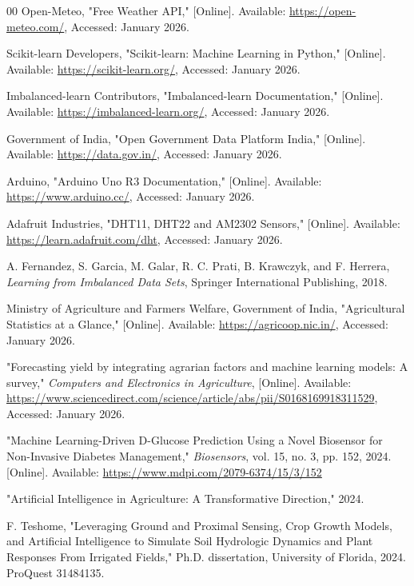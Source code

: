 \documentclass[10pt,twocolumn]{article}
\begin{document}
\begin{thebibliography}{00}
 Open-Meteo, "Free Weather API," [Online]. Available: \url{https://open-meteo.com/}, Accessed: January 2026.

 Scikit-learn Developers, "Scikit-learn: Machine Learning in Python," [Online]. Available: \url{https://scikit-learn.org/}, Accessed: January 2026.

 Imbalanced-learn Contributors, "Imbalanced-learn Documentation," [Online]. Available: \url{https://imbalanced-learn.org/}, Accessed: January 2026.

 Government of India, "Open Government Data Platform India," [Online]. Available: \url{https://data.gov.in/}, Accessed: January 2026.

 Arduino, "Arduino Uno R3 Documentation," [Online]. Available: \url{https://www.arduino.cc/}, Accessed: January 2026.

 Adafruit Industries, "DHT11, DHT22 and AM2302 Sensors," [Online]. Available: \url{https://learn.adafruit.com/dht}, Accessed: January 2026.

 A. Fernandez, S. Garcia, M. Galar, R. C. Prati, B. Krawczyk, and F. Herrera, \textit{Learning from Imbalanced Data Sets}, Springer International Publishing, 2018.

 Ministry of Agriculture and Farmers Welfare, Government of India, "Agricultural Statistics at a Glance," [Online]. Available: \url{https://agricoop.nic.in/}, Accessed: January 2026.

 "Forecasting yield by integrating agrarian factors and machine learning models: A survey," \textit{Computers and Electronics in Agriculture}, [Online]. Available: \url{https://www.sciencedirect.com/science/article/abs/pii/S0168169918311529}, Accessed: January 2026.

 "Machine Learning-Driven D-Glucose Prediction Using a Novel Biosensor for Non-Invasive Diabetes Management," \textit{Biosensors}, vol. 15, no. 3, pp. 152, 2024. [Online]. Available: \url{https://www.mdpi.com/2079-6374/15/3/152}

 "Artificial Intelligence in Agriculture: A Transformative Direction," 2024.

 F. Teshome, "Leveraging Ground and Proximal Sensing, Crop Growth Models, and Artificial Intelligence to Simulate Soil Hydrologic Dynamics and Plant Responses From Irrigated Fields," Ph.D. dissertation, University of Florida, 2024. ProQuest 31484135.


\end{thebibliography}
\end{document}
